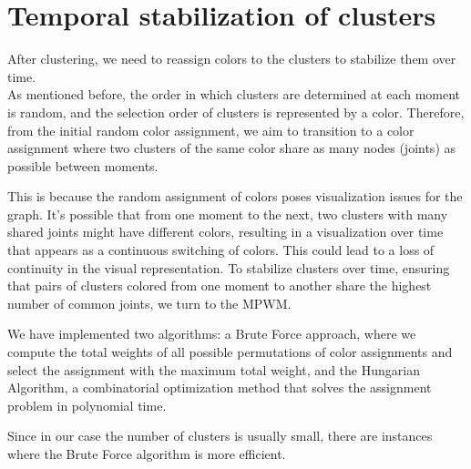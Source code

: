 \section{Temporal stabilization of clusters}

After clustering, we need to reassign colors to the clusters to stabilize them over time. \\
As mentioned before, the order in which clusters are determined at each moment is random, and the selection order of clusters is represented by a color. Therefore, from the initial random color assignment, we aim to transition to a color assignment where two clusters of the same color share as many nodes (joints) as possible between moments.

This is because the random assignment of colors poses visualization issues for the graph. It's possible that from one moment to the next, two clusters with many shared joints might have different colors, resulting in a visualization over time that appears as a continuous switching of colors. This could lead to a loss of continuity in the visual representation.
To stabilize clusters over time, ensuring that pairs of clusters colored from one moment to another share the highest number of common joints, we turn to the MPWM.

We have implemented two algorithms: a Brute Force approach, where we compute the total weights of all possible permutations of color assignments and select the assignment with the maximum total weight, and the Hungarian Algorithm, a combinatorial optimization method that solves the assignment problem in polynomial time.

Since in our case the number of clusters is usually small, there are instances where the Brute Force algorithm is more efficient.

